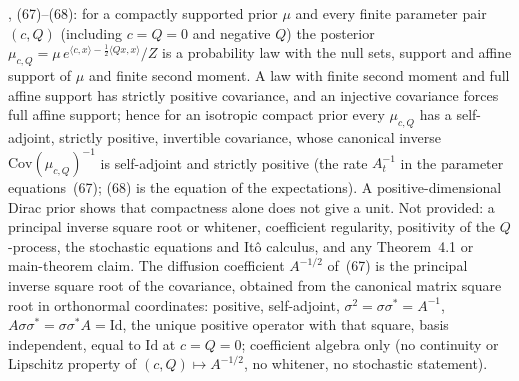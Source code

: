 \begin{lemma}
  \label{lem:bkl-posterior-covariance-domain}
  \leanok
  \cite{BizeulKlartagLehec2026}, (67)--(68): for a compactly supported prior $\mu$ and every finite
  parameter pair $(c,Q)$ (including $c=Q=0$ and negative $Q$) the posterior
  $\mu_{c,Q}=\mu\,e^{\langle c,x\rangle-\frac12\langle Qx,x\rangle}/Z$ is a probability law with the null
  sets, support and affine support of $\mu$ and finite second moment.  A law with finite second moment and full affine support has
  strictly positive covariance, and an injective covariance forces full affine support; hence for an
  isotropic compact prior every $\mu_{c,Q}$ has a self-adjoint, strictly positive, invertible covariance,
  whose canonical inverse $\mathrm{Cov}(\mu_{c,Q})^{-1}$ is self-adjoint and strictly positive (the rate
  $A_t^{-1}$ in the parameter equations~(67); (68) is the equation of the expectations).  A positive-dimensional Dirac prior shows that compactness alone does not give a unit.
  Not provided: a principal inverse square root or whitener, coefficient regularity, positivity of the
  $Q$-process, the stochastic equations and It\^o calculus, and any Theorem~4.1 or main-theorem claim.
  The diffusion coefficient $A^{-1/2}$ of~(67) is the principal inverse square root of the covariance,
  obtained from the canonical matrix square root in orthonormal coordinates: positive, self-adjoint,
  $\sigma^2=\sigma\sigma^*=A^{-1}$, $A\sigma\sigma^*=\sigma\sigma^*A=\mathrm{Id}$, the unique positive
  operator with that square, basis independent, equal to $\mathrm{Id}$ at $c=Q=0$; coefficient algebra only
  (no continuity or Lipschitz property of $(c,Q)\mapsto A^{-1/2}$, no whitener, no stochastic statement).
\end{lemma}
